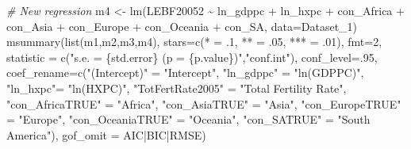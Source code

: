 \documentclass[
]{article}
\newenvironment{Shaded}{\begin{snugshade}}{\end{snugshade}}
\newcommand{\AttributeTok}[1]{\textcolor[rgb]{0.77,0.63,0.00}{#1}}
\newcommand{\CommentTok}[1]{\textcolor[rgb]{0.56,0.35,0.01}{\textit{#1}}}
\newcommand{\DecValTok}[1]{\textcolor[rgb]{0.00,0.00,0.81}{#1}}
\newcommand{\FunctionTok}[1]{\textcolor[rgb]{0.00,0.00,0.00}{#1}}
\newcommand{\NormalTok}[1]{#1}
\newcommand{\OtherTok}[1]{\textcolor[rgb]{0.56,0.35,0.01}{#1}}
\newcommand{\SpecialCharTok}[1]{\textcolor[rgb]{0.00,0.00,0.00}{#1}}
\newcommand{\StringTok}[1]{\textcolor[rgb]{0.31,0.60,0.02}{#1}}
\begin{document}
\begin{Shaded}
\begin{Highlighting}[]
\CommentTok{\# New regression}
\NormalTok{m4 }\OtherTok{\textless{}{-}} \FunctionTok{lm}\NormalTok{(LEBF20052 }\SpecialCharTok{\textasciitilde{}}\NormalTok{ ln\_gdppc }\SpecialCharTok{+}\NormalTok{ ln\_hxpc }\SpecialCharTok{+}\NormalTok{ con\_Africa }\SpecialCharTok{+}\NormalTok{ con\_Asia }\SpecialCharTok{+}\NormalTok{ con\_Europe }\SpecialCharTok{+}\NormalTok{ con\_Oceania }\SpecialCharTok{+}\NormalTok{ con\_SA, }\AttributeTok{data=}\NormalTok{Dataset\_1)}
\FunctionTok{msummary}\NormalTok{(}\FunctionTok{list}\NormalTok{(m1,m2,m3,m4),}
         \AttributeTok{stars=}\FunctionTok{c}\NormalTok{(}\StringTok{\textquotesingle{}*\textquotesingle{}} \OtherTok{=}\NormalTok{ .}\DecValTok{1}\NormalTok{, }\StringTok{\textquotesingle{}**\textquotesingle{}} \OtherTok{=}\NormalTok{ .}\DecValTok{05}\NormalTok{, }\StringTok{\textquotesingle{}***\textquotesingle{}} \OtherTok{=}\NormalTok{ .}\DecValTok{01}\NormalTok{),}
         \AttributeTok{fmt=}\DecValTok{2}\NormalTok{,}
         \AttributeTok{statistic =} \FunctionTok{c}\NormalTok{(}\StringTok{"s.e. = \{std.error\} (p = \{p.value\})"}\NormalTok{,}\StringTok{"conf.int"}\NormalTok{),}
         \AttributeTok{conf\_level=}\NormalTok{.}\DecValTok{95}\NormalTok{,}
         \AttributeTok{coef\_rename=}\FunctionTok{c}\NormalTok{(}\StringTok{"(Intercept)"} \OtherTok{=} \StringTok{"Intercept"}\NormalTok{, }\StringTok{"ln\_gdppc"} \OtherTok{=} \StringTok{"ln(GDPPC)"}\NormalTok{, }\StringTok{"ln\_hxpc"}\OtherTok{=} \StringTok{"ln(HXPC)"}\NormalTok{, }
                       \StringTok{"TotFertRate2005"} \OtherTok{=} \StringTok{"Total Fertility Rate"}\NormalTok{,}
                       \StringTok{"con\_AfricaTRUE"} \OtherTok{=} \StringTok{"Africa"}\NormalTok{, }\StringTok{"con\_AsiaTRUE"} \OtherTok{=} \StringTok{"Asia"}\NormalTok{, }\StringTok{"con\_EuropeTRUE"} \OtherTok{=} \StringTok{"Europe"}\NormalTok{,}
                       \StringTok{"con\_OceaniaTRUE"} \OtherTok{=} \StringTok{"Oceania"}\NormalTok{, }\StringTok{"con\_SATRUE"} \OtherTok{=} \StringTok{"South America"}\NormalTok{),}
         \AttributeTok{gof\_omit =} \StringTok{\textquotesingle{}AIC|BIC|RMSE\textquotesingle{}}\NormalTok{) }
\end{Highlighting}
\end{Shaded}
\end{document}
